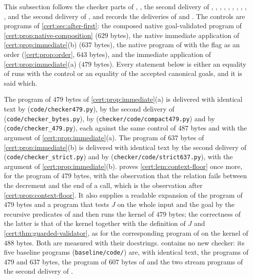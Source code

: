 This subsection follows the checker parts of ,
, the second delivery of ,
, ,
, , ,
, , ,
,  and the second delivery of
, and records the
deliveries of  and .
The controls are programs of \cref{cert:sec:after-first}: the composed native
goal-validated program of \cref{cert:prop:native-composition} ($629$ bytes),
the native immediate application of \cref{cert:prop:immediate}(b) ($637$
bytes), the native program of  with the flag as an order
(\cref{cert:prop:order}, $643$ bytes), and the immediate application of
\cref{cert:prop:immediate}(a) ($479$ bytes). Every statement below is either
an equality of runs with the control or an equality of the accepted canonical
goals, and it is said which.

\begin{remark}\label{cert:rem:repeated-deliveries}
The program of $479$ bytes of \cref{cert:prop:immediate}(a) is delivered with
identical text by  (\texttt{code/checker479.py}), by
the second delivery of 
(\texttt{code/checker\_bytes.py}), by 
(\texttt{checker/code/compact479.py}) and by 
(\texttt{code/checker\_479.py}), each against the same control of $487$
bytes and with the argument of \cref{cert:prop:immediate}(a). The program of
$637$ bytes of \cref{cert:prop:immediate}(b) is delivered with identical text by
the second delivery of 
(\texttt{code/checker\_strict.py}) and by 
(\texttt{checker/code/strict637.py}), with the argument of
\cref{cert:prop:immediate}(b).  proves
\cref{cert:lem:context-floor} once more, for the program of $479$ bytes, with
the observation that the relation fails between the decrement and the end of a
call, which is the observation after \cref{cert:prop:context-floor}. It also
supplies a readable expansion of the program of $479$ bytes and a program that
tests $J$ on the whole input and the goal by the recursive predicates of
 and then runs the kernel of $479$ bytes; the correctness of
the latter is that of the kernel together with the definition of $J$ and
\cref{cert:thm:guarded-validator}, as for the corresponding program of
 on the kernel of $488$ bytes. Both are measured with their
docstrings.  contains no new checker: its five
baseline programs (\texttt{baseline/code/}) are, with identical text, the
programs of $479$ and $637$ bytes, the program of $607$ bytes of
 and the two stream programs of the second delivery
of .
\end{remark}

